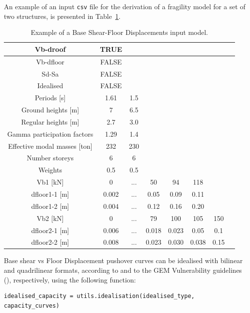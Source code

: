 An example of an input \verb=csv= file for the derivation of a fragility model for a set of two structures, is presented in Table~\ref{table:Vb-dfloor_input}.

\begin {table}[htb]
\caption{Example of a Base Shear-Floor Displacements input model.}
\label{table:Vb-dfloor_input}
\begin{center}
  \begin{tabular}{ | c | c | c | c | c | c | c | c |}
  \hline
    Vb-droof & TRUE &  &  & & & \\ \hline
    Vb-dfloor & FALSE & & & & &  \\ \hline
    Sd-Sa & FALSE & & & & & \\ \hline
    Idealised & FALSE & & & & & \\ \hline
    Periods [s] & 1.61 & 1.5 & & & & \\ \hline
    Ground heights [m] & 7 & 6.5 & & & & \\ \hline
    Regular heights [m] & 2.7 & 3.0 & & & & \\ \hline
    Gamma participation factors & 1.29 & 1.4 & & & & \\ \hline
    Effective modal masses	[ton] & 232 &	230 & & & & \\ \hline
    Number storeys & 6 & 6 & & & & \\ \hline
    Weights & 0.5 & 0.5 & & & & \\ \hline
    Vb1 [kN] & 0	& ...	& 50	& 94	& 118	& \\ \hline
	  dfloor1-1 [m] & 0.002	& ...	& 0.05	& 0.09	& 0.11	& \\ \hline
	  dfloor1-2 [m] & 0.004	& ...	& 0.12	& 0.16	& 0.20	& \\ \hline
    Vb2 [kN] & 0	& ...	& 79	& 100	& 105	& 150 \\ \hline
    dfloor2-1 [m] & 0.006 &	...	& 0.018	& 0.023	& 0.05	& 0.1 \\ \hline
	dfloor2-2 [m] & 0.008	& ... &	0.023	& 0.030	& 0.038	& 0.15 \\ \hline
  \end{tabular}
\end{center}
\end{table}

Base shear vs Floor Displacement pushover curves can be idealised with bilinear and quadrilinear formats, according to \citep{FEMA4402005} and to the GEM Vulnerability guidelines (\citep{Dayala2014}), respectively, using the following function:

\begin{Verbatim}[frame=single, commandchars=\\\{\}, samepage=true]
idealised_capacity = utils.idealisation(idealised_type, capacity_curves)
\end{Verbatim}

